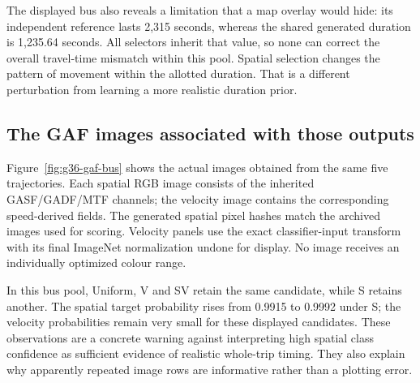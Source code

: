 The displayed bus also reveals a limitation that a map overlay would hide: its independent reference lasts 2,315 seconds, whereas the shared generated duration is 1,235.64 seconds. All selectors inherit that value, so none can correct the overall travel-time mismatch within this pool. Spatial selection changes the pattern of movement within the allotted duration. That is a different perturbation from learning a more realistic duration prior.

\subsection{The GAF images associated with those outputs}
Figure~\ref{fig:g36-gaf-bus} shows the actual images obtained from the same five trajectories. Each spatial RGB image consists of the inherited GASF/GADF/MTF channels; the velocity image contains the corresponding speed-derived fields. The generated spatial pixel hashes match the archived images used for scoring. Velocity panels use the exact classifier-input transform with its final ImageNet normalization undone for display. No image receives an individually optimized colour range.

In this bus pool, Uniform, V and SV retain the same candidate, while S retains another. The spatial target probability rises from 0.9915 to 0.9992 under S; the velocity probabilities remain very small for these displayed candidates. These observations are a concrete warning against interpreting high spatial class confidence as sufficient evidence of realistic whole-trip timing. They also explain why apparently repeated image rows are informative rather than a plotting error.

